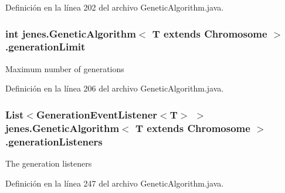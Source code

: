 Definición en la línea 202 del archivo Genetic\-Algorithm.\-java.

\hypertarget{classjenes_1_1_genetic_algorithm_3_01_t_01extends_01_chromosome_01_4_a6677c80cf6ad470a0124fc2fa3051310}{
\subsubsection[{generation\-Limit}]{\setlength{\rightskip}{0pt plus 5cm}int jenes.\-Genetic\-Algorithm$<$ T extends Chromosome $>$.generation\-Limit\hspace{0.3cm}{\ttfamily [protected]}}}\label{classjenes_1_1_genetic_algorithm_3_01_t_01extends_01_chromosome_01_4_a6677c80cf6ad470a0124fc2fa3051310}
Maximum number of generations 

Definición en la línea 206 del archivo Genetic\-Algorithm.\-java.

\hypertarget{classjenes_1_1_genetic_algorithm_3_01_t_01extends_01_chromosome_01_4_a265c4e10d321e68ae5757abf68d88739}{
\subsubsection[{generation\-Listeners}]{\setlength{\rightskip}{0pt plus 5cm}List$<$Generation\-Event\-Listener$<$T$>$ $>$ jenes.\-Genetic\-Algorithm$<$ T extends Chromosome $>$.generation\-Listeners\hspace{0.3cm}{\ttfamily [protected]}}}\label{classjenes_1_1_genetic_algorithm_3_01_t_01extends_01_chromosome_01_4_a265c4e10d321e68ae5757abf68d88739}
The generation listeners 

Definición en la línea 247 del archivo Genetic\-Algorithm.\-java.

